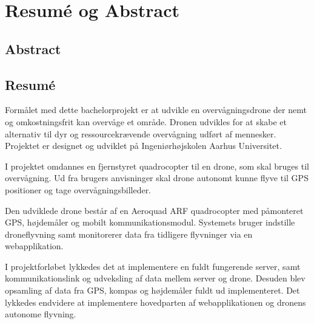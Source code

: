 \chapter{Resumé og Abstract}
\label{chap:resume}


\section*{Abstract}


\section*{Resumé}

Formålet med dette bachelorprojekt er at udvikle en overvågningsdrone der nemt og omkostningsfrit kan overvåge et område. Dronen udvikles for at skabe et alternativ til dyr og ressourcekrævende overvågning udført af mennesker.
Projektet er designet og udviklet på Ingeniørhøjskolen Aarhus Universitet.

I projektet omdannes en fjernstyret quadrocopter til en drone, som skal bruges til overvågning. Ud fra brugers anvisninger skal drone autonomt kunne flyve til GPS positioner og tage overvågningsbilleder.  

Den udviklede drone består af en Aeroquad ARF quadrocopter med påmonteret GPS, højdemåler og mobilt kommunikationsmodul. Systemets bruger indstille droneflyvning samt monitorerer data fra tidligere flyvninger via en webapplikation.  

I projektforløbet lykkedes det at implementere en fuldt fungerende server, samt kommunikationslink og udveksling af data mellem server og drone. Desuden blev opsamling af data fra GPS, kompas og højdemåler fuldt ud implementeret. Det lykkedes endvidere at implementere hovedparten af webapplikationen og dronens autonome flyvning.





